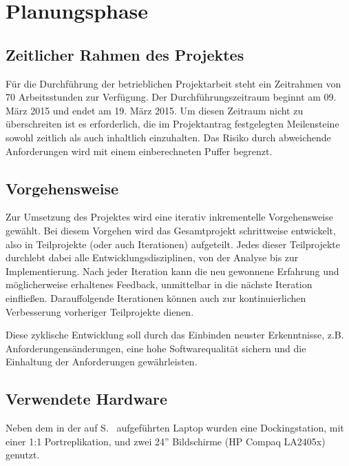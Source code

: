 \section{Planungsphase}
\label{sec:Planungsphase}

\subsection{Zeitlicher Rahmen des Projektes} 
\label{sub:Zeitlicher Rahmen des Projektes} 
Für die Durchführung der betrieblichen Projektarbeit steht ein Zeitrahmen von 70 Arbeitsstunden zur Verfügung. Der
Durchführungszeitraum beginnt am 09. März 2015 und endet am 19. März 2015. Um diesen Zeitraum nicht zu überschreiten ist es
erforderlich, die im Projektantrag festgelegten Meilensteine sowohl zeitlich als auch inhaltlich einzuhalten. Das
Risiko durch abweichende Anforderungen wird mit einem einberechneten Puffer begrenzt.


\subsection{Vorgehensweise} 
\label{sub:Vorgehensweise}
Zur Umsetzung des Projektes wird eine iterativ inkrementelle Vorgehensweise gewählt. Bei diesem
Vorgehen wird das Gesamtprojekt schrittweise entwickelt, also in Teilprojekte (oder auch Iterationen) aufgeteilt. Jedes dieser
Teilprojekte durchlebt dabei alle Entwicklungsdisziplinen, von der Analyse bis zur Implementierung. Nach jeder Iteration kann
die neu gewonnene Erfahrung und möglicherweise erhaltenes Feedback, unmittelbar in die nächste Iteration einfließen.
Darauffolgende Iterationen können auch zur kontinuierlichen Verbesserung vorheriger Teilprojekte dienen.

Diese zyklische Entwicklung soll durch das Einbinden neuster Erkenntnisse, z.B. Anforderungensänderungen, eine hohe
Softwarequalität sichern und die Einhaltung der Anforderungen gewährleisten.


\subsection{Verwendete Hardware} 
\label{sub:Verwendete Hardware}
Neben dem in der  auf S.~\pageref{app:Laptop-Spezifikation} aufgeführten Laptop wurden
eine Dockingstation, mit einer 1:1 Portreplikation, und zwei 24'' Bildschirme (HP Compaq LA2405x) genutzt.


